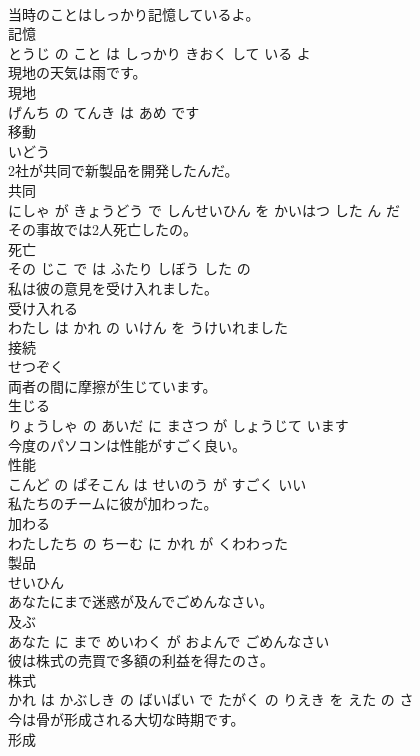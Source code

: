 \documentclass[8pt]{extreport}
\begin{document}
\begin{CJK}{UTF8}{min}
\\	当時のことはしっかり記憶しているよ。	
\\	記憶 
\\	とうじ の こと は しっかり きおく して いる よ			
\\	現地の天気は雨です。	
\\	現地 
\\	げんち の てんき は あめ です			
\\	移動	
\\	いどう			
\\	2社が共同で新製品を開発したんだ。	
\\	共同 
\\	にしゃ が きょうどう で しんせいひん を かいはつ した ん だ			
\\	その事故では2人死亡したの。	
\\	死亡 
\\	その じこ で は ふたり しぼう した の			
\\	私は彼の意見を受け入れました。	
\\	受け入れる 
\\	わたし は かれ の いけん を うけいれました			
\\	接続	
\\	せつぞく			
\\	両者の間に摩擦が生じています。	
\\	生じる 
\\	りょうしゃ の あいだ に まさつ が しょうじて います			
\\	今度のパソコンは性能がすごく良い。	
\\	性能 
\\	こんど の ぱそこん は せいのう が すごく いい			
\\	私たちのチームに彼が加わった。	
\\	加わる 
\\	わたしたち の ちーむ に かれ が くわわった			
\\	製品	
\\	せいひん			
\\	あなたにまで迷惑が及んでごめんなさい。	
\\	及ぶ 
\\	あなた に まで めいわく が およんで ごめんなさい			
\\	彼は株式の売買で多額の利益を得たのさ。	
\\	株式 
\\	かれ は かぶしき の ばいばい で たがく の りえき を えた の さ			
\\	今は骨が形成される大切な時期です。	
\\	形成 

\end{CJK}
\end{document}
